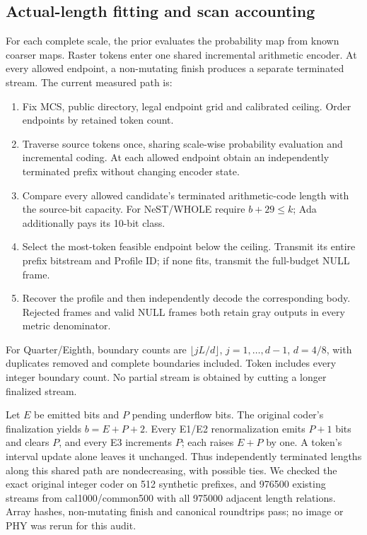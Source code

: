 \documentclass[10pt,letterpaper]{article}
\begin{document}
\subsection{Actual-length fitting and scan accounting}
For each complete scale, the prior evaluates the probability map from known coarser maps. Raster tokens enter one shared incremental arithmetic encoder. At every allowed endpoint, a non-mutating finish produces a separate terminated stream. The current measured path is:
\begin{enumerate}
\item Fix MCS, public directory, legal endpoint grid and calibrated ceiling. Order endpoints by retained token count.
\item Traverse source tokens once, sharing scale-wise probability evaluation and incremental coding. At each allowed endpoint obtain an independently terminated prefix without changing encoder state.
\item Compare every allowed candidate's terminated arithmetic-code length with the source-bit capacity. For NeST/WHOLE require $b+29\le k$; Ada additionally pays its 10-bit class.
\item Select the most-token feasible endpoint below the ceiling. Transmit its entire prefix bitstream and Profile ID; if none fits, transmit the full-budget NULL frame.
\item Recover the profile and then independently decode the corresponding body. Rejected frames and valid NULL frames both retain gray outputs in every metric denominator.
\end{enumerate}
For Quarter/Eighth, boundary counts are $\lfloor jL/d\rfloor$, $j=1,\ldots,d-1$, $d=4/8$, with duplicates removed and complete boundaries included. Token includes every integer boundary count. No partial stream is obtained by cutting a longer finalized stream.

Let $E$ be emitted bits and $P$ pending underflow bits. The original coder's finalization yields $b=E+P+2$. Every E1/E2 renormalization emits $P+1$ bits and clears $P$, and every E3 increments $P$; each raises $E+P$ by one. A token's interval update alone leaves it unchanged. Thus independently terminated lengths along this shared path are nondecreasing, with possible ties. We checked the exact original integer coder on 512 synthetic prefixes, and 976500 existing streams from cal1000/common500 with all 975000 adjacent length relations. Array hashes, non-mutating finish and canonical roundtrips pass; no image or PHY was rerun for this audit.
\end{document}
